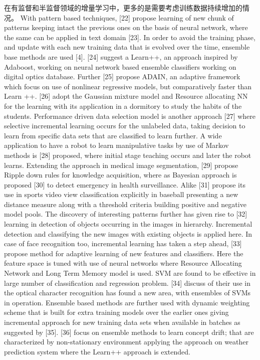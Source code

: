 在有监督和半监督领域的增量学习中，更多的是需要考虑训练数据持续增加的情况。
With pattern based techniques, [22] propose learning of new chunk of patterns keeping intact the previous ones on the basis of neural network, where the same can be applied in text domain [23].
In order to avoid the training phase, and update with each new training data that is evolved over the time, ensemble base methods are used [4]. [24] suggest a Learn++, an approach inspired by Adaboost, working on neural network based ensemble classifiers working on digital optics database. Further [25] propose ADAIN, an adaptive framework which focus on use of nonlinear regressive models, but comparatively faster than Learn ++. [26] adopt the Gaussian mixture model and Resource allocating NN for the learning with its application in a dormitory to study the habits of the students.
Performance driven data selection model is another approach [27] where selective incremental learning occurs for the unlabeled data, taking decision to learn from specific data sets that are classified to learn further.
A wide application to have a robot to learn manipulative tasks by use of Markov methods is [28] proposed, where initial stage teaching occurs and later the robot learns.
Extending the approach in medical image segmentation, [29] propose Ripple down rules for knowledge acquisition, where as Bayesian approach is proposed [30] to detect emergency in health surveillance.
Alike [31] propose its use in sports video view classification explicitly in baseball presenting a new distance measure along with a threshold criteria building positive and negative model pools. The discovery of interesting patterns further has given rise to [32] learning in detection of objects occurring in the images in hierarchy. Incremental detection and classifying the new images with existing objects is applied here. In case of face recognition too, incremental learning has taken a step ahead, [33] propose method for adaptive learning of new features and classifiers. Here the feature space is tuned with use of neural networks where Resource Allocating Network and Long Term Memory model is used.
SVM are found to be effective in large number of classification and regression problem. [34] discuss of their use in the optical character recognition has found a new area, with ensembles of SVMs in operation. Ensemble based methods are further used with dynamic weighting scheme that is built for extra training models over the earlier ones giving incremental approach for new training data sets when available in batches as suggested by [35]. [36] focus on ensemble methods to learn concept drift; that are characterized by non-stationary environment applying the approach on weather prediction system where the Learn++ approach is extended.

